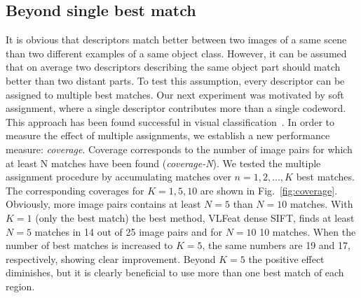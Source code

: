 \documentclass[journal]{IEEEtran}
\begin{document}
%
\subsection{Beyond single best match}
%
It is obvious that descriptors match better between two images of a same
scene than two different examples of a same object class. However,
it can be assumed that on average two descriptors describing
the same object part should match better than two distant parts.
To test this assumption, every descriptor
can be assigned to multiple best matches. Our next experiment
was motivated by soft assignment, where a single descriptor contributes more
than a single codeword. This approach has been found successful in visual
classification~\cite{AgaTri:2008,TuySch:2007,ChaLemVed:2011}.
In order to measure the effect of multiple assignments, we
establish a new performance measure: \textit{coverage}. Coverage
corresponds to the number of image pairs for which at least N matches
have been found ({\em coverage-N}).
We tested the multiple assignment procedure by accumulating matches over
$n = 1, 2, \ldots, K$ best matches. The corresponding coverages for
$K = 1, 5, 10$ are shown in Fig.~\ref{fig:coverage}. Obviously,
more image pairs contains at least $N=5$ than $N=10$ matches.
With $K=1$ (only the best match) the best method, VLFeat dense SIFT,
finds at least $N=5$ matches in 14 out of
25 image pairs and for $N=10$ 10 matches. When the number of best
matches is increased to $K=5$, the same numbers are 19 and 17, respectively,
showing clear improvement. Beyond $K=5$ the positive effect diminishes, but
it is clearly beneficial to use more than one best match of each
region.
%
\end{document}
